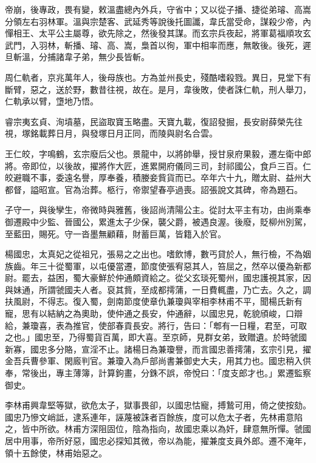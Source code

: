 \begin{pinyinscope}
 帝崩，後專政，畏有變，敕溫盡總內外兵，守省中；又以從子播、捷從弟璿、高嵩分領左右羽林軍。溫與宗楚客、武延秀等說後托圖讖，韋氏當受命，謀殺少帝，內憚相王、太平公主屬尊，欲先除之，然後發其謀。而玄宗兵夜起，將軍葛福順攻玄武門，入羽林，斬播、璿、高、嵩，梟首以徇，軍中相率而應，無敢後。後死，遲旦斬溫，分捕諸韋子弟，無少長皆斬。



 周仁軌者，京兆萬年人，後母族也。方為並州長史，殘酷嗜殺戮。異日，見堂下有斷臂，惡之，送於野，數昔往視，故在。是月，韋後敗，使者誅仁軌，刑人舉刀，仁軌承以臂，墯地乃悟。



 睿宗夷玄貞、洵墳墓，民盜取寶玉略盡。天寶九載，復詔發掘，長安尉薛榮先往視，塚銘載葬日月，與發塚日月正同，而陵與尉名合雲。



 王仁皎，字鳴鶴，玄宗廢后父也。景龍中，以將帥舉，授甘泉府果毅，遷左衛中郎將。帝即位，以後故，擢將作大匠，進累開府儀同三司，封祁國公，食戶三百。仁皎避職不事，委遠名譽，厚奉養，積媵妾貲貨而已。卒年六十九，贈太尉、益州大都督，謚昭宣。官為治葬。柩行，帝禦望春亭過喪。詔張說文其碑，帝為題石。



 子守一，與後孿生，帝微時與雅舊，後詔尚清陽公主。從討太平主有功，由尚乘奉御遷殿中少監、晉國公，累進太子少保，襲父爵，被遇良渥。後廢，貶柳州別駕，至藍田，賜死。守一沓墨無顧藉，財蓄巨萬，皆籍入於官。



 楊國忠，太真妃之從祖兄，張易之之出也。嗜飲博，數丐貸於人，無行檢，不為姻族齒。年三十從蜀軍，以屯優當遷，節度使張宥惡其人，笞屈之，然卒以優為新都尉。罷去，益困，蜀大豪鮮於仲通頗資給之。從父玄琰死蜀州，國忠護視其家，因與妹通，所謂虢國夫人者。裒其貲，至成都摴蒲，一日費輒盡，乃亡去。久之，調扶風尉，不得志。復入蜀，劍南節度使章仇兼瓊與宰相李林甫不平，聞楊氏新有寵，思有以結納之為奧助，使仲通之長安，仲通辭，以國忠見，乾貌頎峻，口辯給，兼瓊喜，表為推官，使部春貢長安。將行，告曰：「郫有一日糧，君至，可取之也。」國忠至，乃得蜀貨百萬，即大喜。至京師，見群女弟，致贈遺。於時虢國新寡，國忠多分賂，宣淫不止。諸楊日為兼瓊譽，而言國忠善摴蒲，玄宗引見，擢金吾兵曹參軍、閑廄判官。兼瓊入為戶部尚書兼御史大夫，用其力也。國忠稍入供奉，常後出，專主薄簿，計算鉤畫，分銖不誤，帝悅曰：「度支郎才也。」累遷監察御史。



 李林甫興韋堅等獄，欲危太子，獄事畏卻，以國忠怙寵，搏鷙可用，倚之使按劾。國忠乃慘文峭詆，逮系連年，誣蔑被誅者百餘族，度可以危太子者，先林甫意陷之，皆中所欲。林甫方深阻固位，陰為指向，故國忠乘以為奸，肆意無所憚。虢國居中用事，帝所好惡，國忠必探知其微，帝以為能，擢兼度支員外郎。遷不淹年，領十五餘使，林甫始惡之。




\end{pinyinscope}
